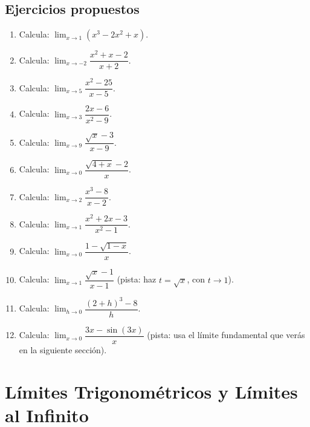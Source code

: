 \documentclass[12pt, a4paper]{article}
\begin{document}
\newpage

\subsection{Ejercicios propuestos}

\begin{enumerate}[leftmargin=*, resume]
  \item \facil{} Calcula: $\lim_{x \to 1} (x^3 - 2x^2 + x)$.

  \item \facil{} Calcula: $\lim_{x \to -2} \dfrac{x^2 + x - 2}{x + 2}$.

  \item \facil{} Calcula: $\lim_{x \to 5} \dfrac{x^2 - 25}{x - 5}$.

  \item \facil{} Calcula: $\lim_{x \to 3} \dfrac{2x - 6}{x^2 - 9}$.

  \item \medio{} Calcula: $\lim_{x \to 9} \dfrac{\sqrt{x} - 3}{x - 9}$.

  \item \medio{} Calcula: $\lim_{x \to 0} \dfrac{\sqrt{4 + x} - 2}{x}$.

  \item \medio{} Calcula: $\lim_{x \to 2} \dfrac{x^3 - 8}{x - 2}$.

  \item \medio{} Calcula: $\lim_{x \to 1} \dfrac{x^2 + 2x - 3}{x^2 - 1}$.

  \item \dificil{} Calcula: $\lim_{x \to 0} \dfrac{1 - \sqrt{1 - x}}{x}$.

  \item \dificil{} Calcula: $\lim_{x \to 1} \dfrac{\sqrt{x} - 1}{x - 1}$ (pista: haz $t = \sqrt{x}$, con $t \to 1$).

  \item \dificil{} Calcula: $\lim_{h \to 0} \dfrac{(2 + h)^3 - 8}{h}$.

  \item \dificil{} Calcula: $\lim_{x \to 0} \dfrac{3x - \sin(3x)}{x}$ (pista: usa el límite fundamental que verás en la siguiente sección).
\end{enumerate}

\newpage

\section{Límites Trigonométricos y Límites al Infinito}
\end{document}
